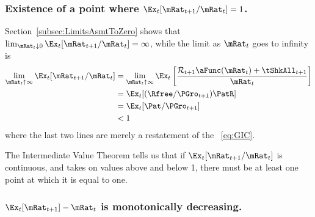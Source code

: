 \documentclass[BufferStockTheory]{subfiles}
\begin{document}
\subsubsection{Existence of a point where $\Ex_t [{\mRat}_{t+1}/\mRat_t]=1$.}
Section~\ref{subsec:LimitsAsmtToZero} shows that $\lim_{\mRat_t \downarrow 0} 
\Ex_t [{\mRat}_{t+1}/\mRat_t] = \infty$, while the limit as $\mRat_{t}$ goes 
to infinity is
\begin{align}
  \lim_{\mRat_{t} \uparrow \infty} \Ex_{t}[{\mRat}_{t+1}/\mRat_{t}]  & =   
                                                                       \lim_{\mRat_{t} \uparrow \infty} 
                                                                       \Ex_{t}\left[\frac{{\mathcal{\mathcal{R}}}_{t+1}\aFunc(\mRat_{t})+{\tShkAll}_{t+1}}{\mRat_{t}}\right] \notag 
  \\  & = \Ex_{t}[(\Rfree/{\PGro}_{t+1})\PatR]
  \\  & = \Ex_{t}[{\Pat}/{\PGro}_{t+1}] \notag
  \\  & < 1 \notag
\end{align}
where the last two lines are merely a restatement of the \GIC~\eqref{eq:GIC}.

The Intermediate Value Theorem tells us that if $\Ex_t [{\mRat}_{t+1}/\mRat_t]$ is continuous, and takes on values above and below 1, there must be at least one point at which it is equal to one.

\subsubsection{$\Ex_t [{\mRat}_{t+1}] -\mRat_t$ is monotonically decreasing.}
\end{document}
